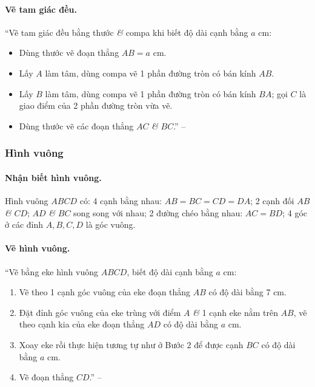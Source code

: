 \documentclass{article}
\numberwithin{equation}{section}
\begin{document}
\paragraph{Vẽ tam giác đều.} ``Vẽ tam giác đều bằng thước \textit{\&} compa khi biết độ dài cạnh bằng $a$ cm:
\begin{itemize}
	\item Dùng thước vẽ đoạn thẳng $AB = a$ cm.
	\item Lấy $A$ làm tâm, dùng compa vẽ 1 phần đường tròn có bán kính $AB$.
	\item Lấy $B$ làm tâm, dùng compa vẽ 1 phần đường tròn có bán kính $BA$; gọi $C$ là giao điểm của 2 phần đường tròn vừa vẽ.
	\item Dùng thước vẽ các đoạn thẳng $AC$ \textit{\&} $BC$.'' -- \cite[p. 94]{Thai_Anh_Dat_Ha_Loan_Nam_Quang_Toan_6_tap_1}
\end{itemize}

\subsubsection{Hình vuông}

\paragraph{Nhận biết hình vuông.} Hình vuông $ABCD$ có: 4 cạnh bằng nhau: $AB = BC = CD = DA$; 2 cạnh đối $AB$ \textit{\&} $CD$; $AD$ \textit{\&} $BC$ song song với nhau; 2 đường chéo bằng nhau: $AC = BD$; 4 góc ở các đỉnh $A,B,C,D$ là góc vuông.

\paragraph{Vẽ hình vuông.} ``Vẽ bằng eke hình vuông $ABCD$, biết độ dài cạnh bằng $a$ cm:
\begin{enumerate}
	\item Vẽ theo 1 cạnh góc vuông của eke đoạn thẳng $AB$ có độ dài bằng 7 cm.
	\item Đặt đỉnh góc vuông của eke trùng với điểm $A$ \textit{\&} 1 cạnh eke nằm trên $AB$, vẽ theo cạnh kia của eke đoạn thẳng $AD$ có độ dài bằng $a$ cm.
	\item Xoay eke rồi thực hiện tương tự như ở Bước 2 để được cạnh $BC$ có độ dài bằng $a$ cm.
	\item Vẽ đoạn thẳng $CD$.'' -- \cite[p. 95]{Thai_Anh_Dat_Ha_Loan_Nam_Quang_Toan_6_tap_1}
\end{enumerate}
\end{document}
